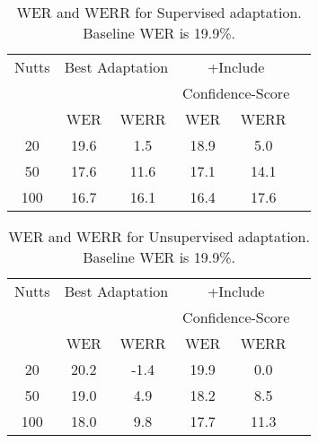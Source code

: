 \begin{table}
\begin{center}
\begin{small}
\caption{WER and WERR for Supervised adaptation. Baseline WER is 19.9\%.} \label{tab:sup-WER}
\begin{tabular}{|c|c|c|c|c|c|}
\hline
Nutts &  \multicolumn{2}{|c|}{Best Adaptation} & \multicolumn{2}{|c|}{+Include} \\
&  \multicolumn{2}{|c|}{ }  & \multicolumn{2}{|c|}{Confidence-Score} \\
\hline
 &   WER & WERR & WER & WERR\\
\hline
20 &  19.6  & 1.5  & 18.9 & 5.0\\
50 &  17.6  & 11.6  & 17.1 & 14.1\\
100 &  16.7  & 16.1  & 16.4 & 17.6\\
\hline
\end{tabular}
\end{small}
\end{center}
\end{table}

\begin{table}
\begin{center}
\begin{small}
\caption{WER and WERR for Unsupervised adaptation. Baseline WER is 19.9\%.} \label{tab:unsup-WER}
\begin{tabular}{|c|c|c|c|c|c|}
\hline
Nutts &  \multicolumn{2}{|c|}{Best Adaptation} & \multicolumn{2}{|c|}{+Include} \\
&  \multicolumn{2}{|c|}{ }  & \multicolumn{2}{|c|}{Confidence-Score} \\
\hline
 &   WER & WERR & WER & WERR\\
\hline
20 &  20.2  & -1.4  & 19.9 & 0.0\\
50 &  19.0  & 4.9  & 18.2 & 8.5\\
100 &  18.0  & 9.8  & 17.7 & 11.3\\
\hline
\end{tabular}
\end{small}
\end{center}
\end{table}
